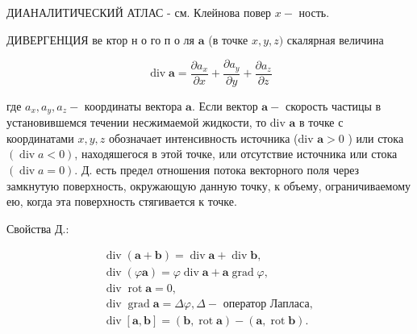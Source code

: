 \documentclass[10pt]{article}
\begin{document}
ДИАНАЛИТИЧЕСКИЙ АТЛАС - см. Клейнова повер $x-$ ность.



ДИВЕРГЕНЦИЯ ве ктор н о го п о ля $\boldsymbol{a}$ (в точке $x, y, z)$ скалярная величина



\[

\operatorname{div} \boldsymbol{a}=\frac{\partial a_{x}}{\partial x}+\frac{\partial a_{y}}{\partial y}+\frac{\partial a_{z}}{\partial z}

\]



где $a_{x}, a_{y}, a_{z}-$ координаты вектора $\boldsymbol{a}$. Если вектор $\boldsymbol{a}-$ скорость частицы в установившемся течении несжимаемой жидкости, то div $\boldsymbol{a}$ в точке с координатами $x, y, z$ обозначает интенсивность источника (div $\boldsymbol{a}>0$ ) или стока $(\operatorname{div} a<0)$, находяшегося в этой точке, или отсутствие источника или стока $(\operatorname{div} a=0)$. Д. есть предел отношения потока векторного поля через замкнутую поверхность, окружающую данную точку, к объему, ограничиваемому ею, когда эта поверхность стягивается к точке.



Свойства Д.:



\[

\begin{gathered}

\operatorname{div}(\boldsymbol{a}+\boldsymbol{b})=\operatorname{div} \boldsymbol{a}+\operatorname{div} \boldsymbol{b}, \\

\operatorname{div}(\varphi \boldsymbol{a})=\varphi \operatorname{div} \boldsymbol{a}+\boldsymbol{a} \operatorname{grad} \varphi, \\

\operatorname{div} \operatorname{rot} \boldsymbol{a}=0, \\

\operatorname{div} \operatorname{grad} \boldsymbol{a}=\Delta \varphi, \Delta-\text { оператор Лапласа, } \\

\operatorname{div}[\boldsymbol{a}, \boldsymbol{b}]=(\boldsymbol{b}, \operatorname{rot} \boldsymbol{a})-(\boldsymbol{a}, \operatorname{rot} \boldsymbol{b}) .

\end{gathered}

\]
\end{document}
